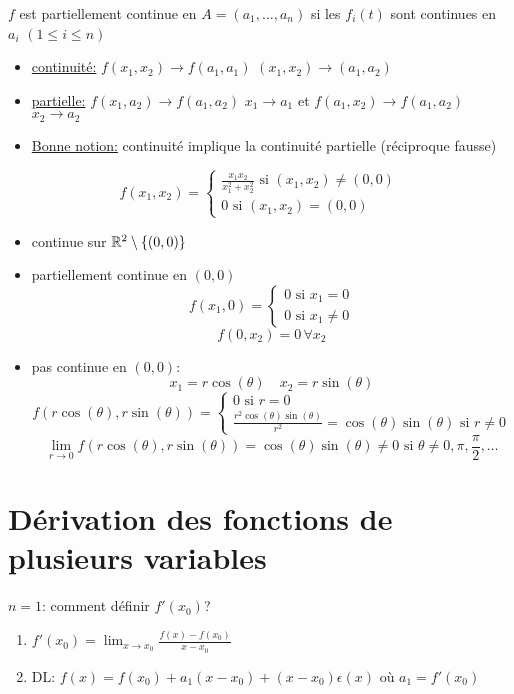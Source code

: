 \begin{definition}
    $f$ est partiellement continue en  $A = (a_1, \ldots, a_n)$ si les $f_i(t)$ sont continues en  $a_i$ $(1 \le i \le n)$
\end{definition}
\begin{itemize}
    \item 
\underline{continuité:} $f(x_1, x_2) \to f(a_1, a_1)$ $(x_1, x_2) \to (a_1, a_2)$ 
    \item 
\underline{partielle:} $f(x_1, a_2) \to  f(a_1, a_2)$ $x_1 \to a_1$ et $f(a_1, x_2) \to f(a_1, a_2)$ $x_2 \to a_2$
    \item 
\underline{Bonne notion:} continuité implique la continuité partielle (réciproque fausse)
\end{itemize}
\begin{eg}
\[
f(x_1, x_2) = \begin{cases}
    \frac{x_1x_2}{x_1^2 + x_2^2} \text{ si } (x_1, x_2) \neq (0, 0)\\
    0 \text{ si } (x_1, x_2)=(0, 0)
\end{cases}
\]     
\begin{itemize}
    \item continue sur $\mathbb{R}^2 \setminus \{(0, 0)\}$
    \item partiellement continue en $(0, 0)$
         \[
        f(x_1, 0) = \begin{cases}
            0 \text{ si } x_1 = 0\\
            0 \text{ si } x_1 \neq 0
        \end{cases}
        \] 
        \[
        f(0, x_2) = 0 \, \forall x_2
        \] 
    \item pas continue en $(0, 0)$:
         \[
        x_1 = r \cos(\theta) \quad x_2 = r \sin(\theta)
        \] 
        \[
        f(r\cos(\theta), r\sin(\theta)) = \begin{cases}
            0 \text{ si } r = 0\\
            \frac{r^2\cos(\theta)\sin(\theta)}{r^2} = \cos(\theta)\sin(\theta) \text{ si } r \neq 0
        \end{cases}
        \] 
        \[
        \lim_{r \to 0} f(r\cos(\theta), r\sin(\theta)) = \cos(\theta)\sin(\theta) \neq 0 \text{ si } \theta \neq 0, \pi, \frac{\pi}{2}, \ldots
        \] 
\end{itemize}
\end{eg}


\section{Dérivation des fonctions de plusieurs variables}
$n = 1$: comment définir  $f'(x_0)$?
\begin{enumerate}
    \item $f'(x_0) = \lim_{x \to x_0} \frac{f(x) - f(x_0)}{x - x_0}$
    \item DL: $f(x) = f(x_0) + a_1(x - x_0) + (x - x_0)\epsilon(x)$ où $a_1 = f'(x_0)$
\end{enumerate}

